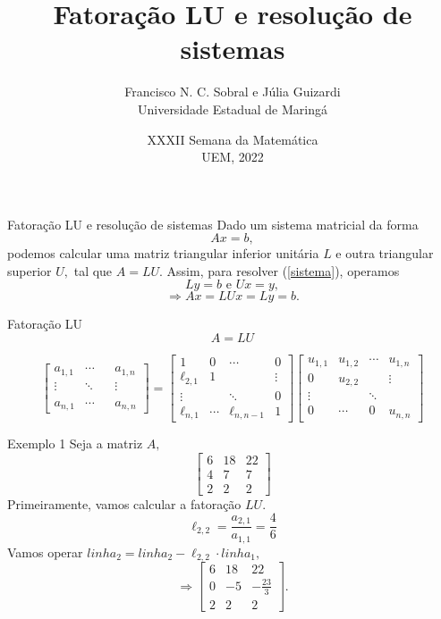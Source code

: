 \documentclass[]{beamer}
\author[Sobral]{Francisco N. C. Sobral e Júlia Guizardi\\ Universidade Estadual de Maringá}
\date[XXIX SEMAT]{XXXII Semana da Matemática\\UEM, 2022}
\title[Mat. Mult.]{Fatoração LU e resolução de sistemas}
\begin{document}
\begin{frame}[plain]
\titlepage
\end{frame}

\begin{frame}{Fatoração LU e resolução de sistemas}
	Dado um sistema matricial da forma 
	\begin{equation}\label{sistema}
	Ax=b,
	\end{equation}
	podemos calcular uma matriz triangular inferior unitária $L$ e outra triangular superior $U,$ tal que $A=LU.$ Assim, para resolver (\ref{sistema}), operamos
	$$Ly=b \text{  e  } Ux=y,$$
	$$\Rightarrow Ax=LUx=Ly=b.$$
\end{frame}

\begin{frame}{Fatoração LU}
	\begin{equation}
	A=LU
	\end{equation}
	
	$$
	\begin{bmatrix}
	a_{1,1} & \cdots &  & a_{1,n}\\
	\vdots & \ddots  & & \vdots\\
	& &  & \\
	a_{n,1} & \cdots &  & a_{n,n}
	\end{bmatrix}
	=
	\begin{bmatrix}
	1 & 0 & \cdots & 0\\
	\ell_{2,1} & 1 & & \vdots\\
	\vdots & & \ddots & 0\\
	\ell_{n,1} & \cdots & \ell_{n,n-1} & 1
	\end{bmatrix}\begin{bmatrix}
	u_{1,1} & u_{1,2} & \cdots & u_{1,n}\\
	0 & u_{2,2} & & \vdots\\
	\vdots & & \ddots & \\
	0 & \cdots & 0 & u_{n,n}
	\end{bmatrix}
	$$
\end{frame}

\begin{frame}{Exemplo 1}
Seja a matriz $A,$
$$\begin{bmatrix}6&18&22\\ 4&7&7\\ 2&2&2\end{bmatrix}$$
Primeiramente, vamos calcular a fatoração $LU.$
$$\ell_{2,2} = \dfrac{a_{2,1}}{a_{1,1}}= \dfrac{4}{6}$$
Vamos operar $linha_2 = linha_2 - \ell_{2,2} \cdot linha_1,$
$$\Rightarrow \begin{bmatrix}6&18&22\\ 0&-5&-\frac{23}{3}\\ 2&2&2\end{bmatrix}.$$
\end{frame}
\end{document}
